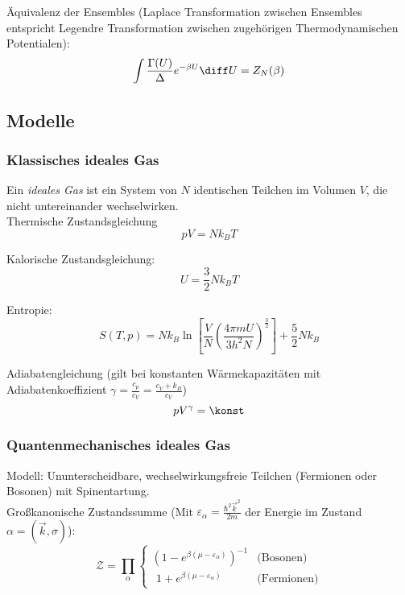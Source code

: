 \documentclass[11pt]{article}
\numberwithin{equation}{section}
\begin{document}
        Äquivalenz der Ensembles (Laplace Transformation zwischen Ensembles entspricht Legendre Transformation zwischen zugehörigen Thermodynamischen Potentialen):
        \begin{equation}
          \int \frac{\Gamma(U)}{\Delta} e^{-\beta U} \diff U = Z_N(\beta)
        \end{equation}



    \subsection{Modelle}
      \subsubsection{Klassisches ideales Gas}
        Ein \emph{ideales Gas} ist ein System von $N$ identischen Teilchen im Volumen $V$, die nicht untereinander wechselwirken. \\

        Thermische Zustandsgleichung
        \begin{equation}
          pV = N k_B T
        \end{equation}

        Kalorische Zustandsgleichung:
        \begin{equation}
          U = \frac{3}{2} N k_B T
        \end{equation}

        Entropie:
        \begin{equation}
          S(T,p) = N k_B \ln{\left[ \frac{V}{N}\left( \frac{4\pi m  U}{3 h^2 N} \right)^{\frac{3}{2}} \right]} + \frac{5}{2} N k_B
        \end{equation}

        Adiabatengleichung (gilt bei konstanten Wärmekapazitäten mit Adiabatenkoeffizient $\gamma = \frac{c_p}{c_V} = \frac{c_V + k_B}{c_V}$)
        \begin{equation}
          p V^\gamma = \konst
        \end{equation}

      \subsubsection{Quantenmechanisches ideales Gas}
        Modell: Ununterscheidbare, wechselwirkungsfreie Teilchen (Fermionen oder Bosonen) mit Spinentartung. \\

        Großkanonische Zustandssumme (Mit $\varepsilon_\alpha = \frac{\hbar^2 \vec{k}^2}{2m}$ der Energie im Zustand $\alpha=(\vec{k},\sigma)$):
        \begin{equation}
          \mathcal{Z} = \prod_{\alpha}
            \begin{cases}
              \left( 1-e^{\beta(\mu-\varepsilon_\alpha)}\right)^{-1} & \text{(Bosonen)} \\
              \phantom{\big(} 1+e^{\beta(\mu-\varepsilon_\alpha)} & \text{(Fermionen)}
            \end{cases}
        \end{equation}
\end{document}
